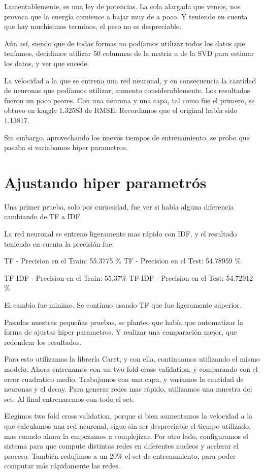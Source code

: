 Lamentablemente, es una ley de potencias. La cola alargada que vemos, nos provoca que la energía comience a bajar muy de a poco. Y teniendo en cuenta que hay muchisimos terminos, el peso no es despreciable.

Aún así, siendo que de todas formas no podíamos utilizar todos los datos que teníamos, decidimos utilizar 50 columnas de la matriz u de la SVD para estimar los datos, y ver que sucede.

La velocidad a la que se entrena una red neuronal, y en consecuencia la cantidad de neuronas que podíamos utilizar, aumento considerablemente. Los resultados fueron un poco peores. 
Con una neurona y una capa, tal como fue el primero, se obtuvo en kaggle 1.32583 de RMSE. Recordamos que el original había sido 1.13817.

Sin embargo, aprovechando los nuevos tiempos de entrenamiento, se probo que pasaba si variabamos hiper parametros.

 
\section{Ajustando hiper parametrós}

Una primer prueba, solo por curiosidad, fue ver si había alguna diferencia cambiando de TF a IDF.

La red neuronal se entreno ligeramente mas rápido con IDF, y el resultado teniendo en cuenta la precisión fue:


TF - Precision en el Train: 55.3775 \%  
TF - Precision en el Test: 54.78959 \%

TF-IDF - Precision en el Train: 55.37\%  
TF-IDF  - Precision en el Test: 54.72912 \%

El cambio fue minimo. Se continuo usando TF que fue ligeramente superior.

Pasadas nuestras pequeñas pruebas, se planteo que había que automatizar la forma de ajustar hiper parametros. Y realizar una comparación mejor, que redondear los resultados.

Para esto utilizamos la librería Caret, y con ella, continuamos utilizando el mismo modelo. Ahora entrenamos con un two fold cross validation, y comparando con el error cuadratico medio. Trabajamos con una capa, y variamos la cantidad de neuronas y el decay. Para generar redes mas rápido, utilizamos una muestra del set. Al final entrenaremos con todo el set.

Elegimos two fold cross validation, porque si bien aumentamos la velocidad a la que calculamos una red neuronal, sigue sin ser despreciable el tiempo utilizado, mas cuando ahora la empezamos a complejizar. Por otro lado, configuramos el sistema para que compute distintas redes en diferentes nucleos y acelerar el proceso. También redujimos a un 20\% el set de entrenamiento, para poder computar más rápidamente las redes.

